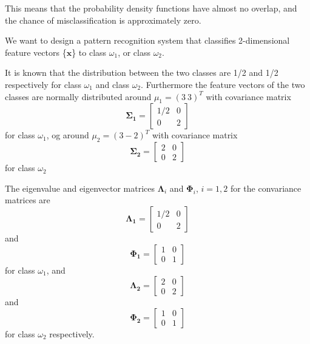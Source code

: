 \documentclass{homeworg}
\begin{document}
This means that the probability density functions have almost no overlap, and the chance of misclassification is approximately zero.


\problem
We want to design a pattern recognition system that 
classifies 2-dimensional feature vectors \{$\bm{x}$\} to class 
$\omega_1$, or class $\omega_2$.

It is known that the distribution between the two classes are 
1/2 and 1/2 respectively for class $\omega_1$ and class $\omega_2$. 
Furthermore the feature vectors of the two classes are normally 
distributed around $\mu_1 = (3 \: 3)^T$ with covariance matrix
\begin{equation}
    \bm{\Sigma_1} =
    \begin{bmatrix}
        1/2 & 0 \\
        0 & 2
    \end{bmatrix}
\end{equation}
for class $\omega_1$, og around $\mu_2 = (3 - 2)^T$ with covariance matrix
\begin{equation}
    \bm{\Sigma_2} = 
    \begin{bmatrix}
        2 & 0 \\
        0 & 2
    \end{bmatrix}
\end{equation}
for class $\omega_2$

The eigenvalue and eigenvector matrices $\bm{\Lambda}_i$ and $\bm{\Phi}_i$, 
$i = 1, 2$ for the convariance matrices are
\begin{equation}
    \bm{\Lambda_1} =
    \begin{bmatrix}
        1/2 & 0 \\
        0 & 2
    \end{bmatrix}
\end{equation}
and
\begin{equation}
    \bm{\Phi_1} =
    \begin{bmatrix}
        1 & 0 \\
        0 & 1
    \end{bmatrix}
\end{equation}
for class $\omega_1$, and
\begin{equation}
    \bm{\Lambda_2} =
    \begin{bmatrix}
        2 & 0 \\
        0 & 2
    \end{bmatrix}
\end{equation}
and
\begin{equation}
    \bm{\Phi_2} =
    \begin{bmatrix}
        1 & 0 \\
        0 & 1
    \end{bmatrix}
\end{equation}
for class $\omega_2$ respectively.
\end{document}
